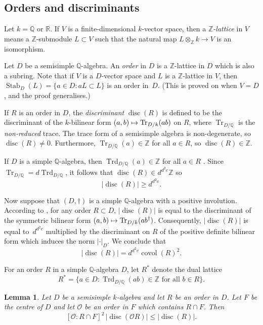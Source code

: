 \documentclass[11pt]{article}
\numberwithin{equation}{section}
\def\mto{\mathchoice{\longmapsto}{\mapsto}{\mapsto}{\mapsto}}
\newcommand{\bQ}{\mathbb{Q}}
\newcommand{\bR}{\mathbb{R}}
\newcommand{\bZ}{\mathbb{Z}}
\newcommand{\cO}{\mathcal{O}}
\DeclareMathOperator{\covol}{covol}
\DeclareMathOperator{\disc}{disc}
\DeclareMathOperator{\Stab}{Stab}
\DeclareMathOperator{\Tr}{Tr}
\DeclareMathOperator{\Trd}{Trd}
\newcommand{\abs}[1]{\lvert #1 \rvert}
\newcommand{\defterm}[1]{\emph{#1}}
\newtheorem{lemma}{Lemma}[section]
\begin{document}
\subsection{Orders and discriminants}\label{sec:orders}

Let $k = \bQ$ or $\bR$.
If $V$ is a finite-dimensional $k$\nobreakdash-vector space, then a \defterm{$\bZ$-lattice} in $V$ means a $\bZ$-submodule $L \subset V$ such that the natural map $L \otimes_\bZ k \to V$ is an isomorphism.

Let $D$ be a semisimple $\bQ$-algebra.
An \defterm{order} in $D$ is a $\bZ$-lattice in $D$ which is also a subring.
Note that if $V$ is a $D$-vector space and $L$ is a $\bZ$-lattice in $V$, then $\Stab_D(L) = \{ a \in D : aL \subset L \}$ is an order in~$D$. (This is proved on \cite[p.\,109]{Rei75} when $V=D$, and the proof generalises.)

If $R$ is an order in $D$, the \defterm{discriminant} $\disc(R)$ is defined to be the discriminant of the $k$-bilinear form $(a,b) \mto \Tr_{D/k}(ab)$ on $R$, where $\Tr_{D/\bQ}$ is the \emph{non-reduced} trace.
The trace form of a semisimple algebra is non-degenerate, so $\disc(R) \neq 0$.
Furthermore, $\Tr_{D/\bQ}(a) \in \bZ$ for all $a \in R$, so $\disc(R) \in \bZ$.

If $D$ is a simple $\bQ$-algebra, then $\Trd_{D/\bQ}(a) \in \bZ$ for all $a \in R$ \cite[Th.\,10.1]{Rei75}.
Since $\Tr_{D/\bQ} = d \Trd_{D/\bQ}$, it follows that $\disc(R) \in d^{d^2e} \bZ$ so
\begin{equation} \label{eqn:disc-lower-bound}
\abs{\disc(R)} \geq d^{d^2e}.
\end{equation}

Now suppose that $(D,\dag)$ is a simple $\bQ$-algebra with a positive involution.
According to \cite[Lem.\,5.6]{QRTUI}, for any order $R \subset D$, $\abs{\disc(R)}$ is equal to the discriminant of the symmetric bilinear form $(a,b) \mto \Tr_{D/k}(ab^\dag)$.
Consequently, $\abs{\disc(R)}$ is equal to~$d^{d^2e}$ multiplied by the discriminant on $R$ of the positive definite bilinear form which induces the norm $\abs{\cdot}_D$.
We conclude that
\begin{equation} \label{eqn:disc-covol}
\abs{\disc(R)} = d^{d^2e}\covol(R)^2.
\end{equation}

For an order $R$ in a simple $\bQ$-algebra $D$, let $R^*$ denote the dual lattice
\[
R^* = \{ a \in D : \Trd_{D/\bQ}(ab) \in \bZ \text{ for all } b \in R \}.
\]

\begin{lemma} \label{index-RcapF}
Let $D$ be a semisimple $k$-algebra and let $R$ be an order in $D$.
Let $F$ be the centre of $D$ and let $\cO$ be an order in $F$ which contains $R \cap F$.
Then
\[
[\cO:R \cap F]^2 \, \abs{\disc(\cO R)} \leq \abs{\disc(R)}.
\]
\end{lemma}
\end{document}
